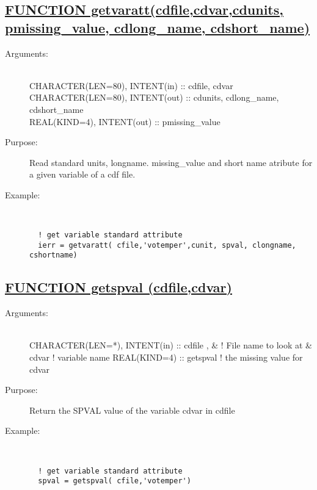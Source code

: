 \documentclass[a4paper,11pt]{article}
\begin{document}
\subsection*{\underline{FUNCTION getvaratt(cdfile,cdvar,cdunits, pmissing\_value, cdlong\_name, cdshort\_name)  }}
\begin{description}
\item[Arguments:] \ \\
    CHARACTER(LEN=80), INTENT(in) :: cdfile, cdvar \\
    CHARACTER(LEN=80), INTENT(out) :: cdunits, cdlong\_name, cdshort\_name \\
    REAL(KIND=4), INTENT(out) :: pmissing\_value
\item[Purpose:] Read standard units, longname. missing\_value and short name atribute for a given variable of a cdf file.
\item[Example:] \ \\
\begin{verbatim}
  ! get variable standard attribute
  ierr = getvaratt( cfile,'votemper',cunit, spval, clongname, cshortname)
\end{verbatim}
\end{description}

\subsection*{\underline{FUNCTION getspval (cdfile,cdvar) }}
\begin{description}
\item[Arguments:] \ \\
    CHARACTER(LEN=*), INTENT(in) :: cdfile , \&  ! File name to look at
         \&                           cdvar      ! variable name
    REAL(KIND=4) :: getspval                               ! the missing value for cdvar
\item[Purpose:] Return the SPVAL value of the variable  cdvar  in cdfile
\item[Example:] \ \\
\begin{verbatim}
  ! get variable standard attribute
  spval = getspval( cfile,'votemper')
\end{verbatim}
\end{description}
\end{document}
